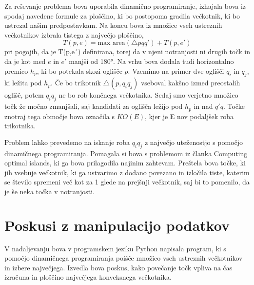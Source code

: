 \documentclass[a4, 12pt]{article}
\begin{document}
Za reševanje problema bova uporabila dinamično programiranje, izhajala bova iz spodaj navedene formule za ploščino, ki bo postopoma gradila večkotnik, 
ki bo ustrezal našim predpostavkam. Na koncu bova iz množice vseh ustreznih večkotnikov izbrala tistega z največjo ploščino,
 $${T(p,e)} =  \text{max area} ( \triangle pqq') + T(p,e' )$$ 
 pri pogojih, da je T(p,e´) definirana, torej da v njeni notranjosti ni drugih točk in da je kot med $e$ in $e'$  manjši od 180°. 
Na vrhu bova dodala tudi horizontalno premico $h_p$, ki bo potekala skozi oglišče $p$. Vzemimo na primer dve oglišči $q_i$ in $q_j$, ki ležita pod $h_p$. Če bo trikotnik $ \triangle(p,q_iq_j)$ vseboval kakšno izmed preostalih oglišč, potem $q_iq_j$ ne bo rob končnega večkotnika. Sedaj smo verjetno množico točk že močno zmanjšali, saj kandidati za oglišča ležijo pod $h_p$ in nad $q'q$. Točke znotraj tega območje bova označila s $KO(E)$, kjer je E nov podaljšek roba trikotnika.

Problem lahko prevedemo na iskanje roba $q_iq_j$ z največjo uteženostjo s pomočjo dinamičnega programiranja. Pomagala si bova s problemom iz članka Computing optimal islands, ki ga bova prilagodila najinim zahtevam. Preštela bova točke, ki jih vsebuje večkotnik, ki ga ustvarimo z dodano povezano in izločila tiste, katerim se število spremeni več kot za 1 glede na prejšnji večkotnik, saj bi to pomenilo, da je še neka točka v notranjosti. 

\section{Poskusi z manipulacijo podatkov}

V nadaljevanju bova v programskem jeziku Python napisala program, ki s pomočjo dinamičnega programiranja poišče množico vseh ustreznih večkotnikov in izbere največjega. Izvedla bova poskus, kako povečanje točk vpliva na čas izračuna in ploščino največjega konveksnega večkotnika.
\end{document}
